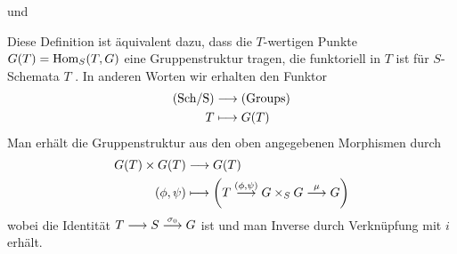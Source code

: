 \documentclass[german]{scrreprt}
\begin{document}
\begin{Definition}[$S$-Gruppenschema]
\begin{description}[labelwidth=4cm]
    und
  \item[Assoziativität]
\end{description}
\begin{Bemerkung}
  Diese Definition ist äquivalent dazu, dass die $T$-wertigen Punkte
  $G(T)=\operatorname{Hom}_S(T,G)$ eine Gruppenstruktur tragen, die funktoriell in
  $T$ ist für $S$-Schemata $T$ \cite[siehe][(4.15)]{wedhorn}. 
  In anderen Worten wir erhalten den Funktor 
  \begin{align*}
    \text{(Sch/S)} &\longrightarrow \text{(Groups)}\\
    T &\longmapsto G(T)
  \end{align*}
  Man erhält die Gruppenstruktur aus den oben angegebenen Morphismen
  durch
  \begin{align*}
    G(T)\times G(T) &\longrightarrow G(T)\\
    (\phi, \psi) &\longmapsto 
                   \left(
                   T\overset{(\phi,\psi)}{\longrightarrow} G\times_S G
                   \overset\mu{\longrightarrow} G
                   \right)
  \end{align*}
  wobei die Identität $T\longrightarrow S\overset{\sigma_0}{\longrightarrow} G$ ist und
  man Inverse durch Verknüpfung mit $i$ erhält.
  \cite[siehe][Proposition IV.3.2]{silverman2}
\end{Bemerkung}


\end{Definition}
\end{document}
